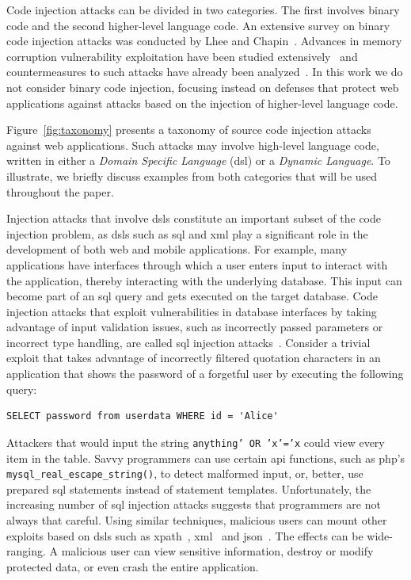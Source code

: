 \documentclass[10pt,journal,compsoc]{IEEEtran}
\begin{document}
Code injection attacks can be divided in two categories. The first
involves binary code and the second higher-level language code. An
extensive survey on binary code injection attacks was conducted by
Lhee and Chapin~\cite{LC03}. Advances in memory corruption vulnerability
exploitation have been studied extensively~\cite{PB04, SPWS13}
and countermeasures to such attacks
have already been analyzed~\cite{YJP12}.
In this work we do not consider binary code injection,
focusing instead on defenses
that protect web applications against attacks based on the
injection of higher-level language code.

Figure~\ref{fig:taxonomy} presents a taxonomy of source
code injection attacks against web applications.
Such attacks may involve high-level language code, written in either a
{\it Domain Specific Language} ({\sc dsl}) or a {\it Dynamic Language}.
To illustrate, we briefly discuss examples from both categories
that will be used throughout the paper.

Injection attacks that involve {\sc dsl}s constitute an important
subset of the code injection problem, as {\sc dsl}s such as
{\sc sql} and {\sc xml} play a significant role in the development of
both web and mobile applications. For example, many applications have
interfaces through which a user enters input to interact with the
application, thereby interacting with the underlying database. This
input can become part of an {\sc sql} query and gets executed on the
target database. Code injection attacks that exploit vulnerabilities
in database interfaces by taking advantage of input validation issues,
such as incorrectly passed parameters or incorrect type handling, are
called {\sc sql} injection attacks~\cite{MS09,HVO06,SW06}.
Consider a trivial exploit that takes advantage of incorrectly
filtered quotation characters in an application that shows the
password of a forgetful user by executing the following
query:

\lstset{language=SQL}
\begin{lstlisting}
SELECT password from userdata WHERE id = 'Alice'
\end{lstlisting}

\noindent
Attackers that would input the string {\tt anything' OR 'x'='x}
could view every item in the table.
Savvy programmers can use certain {\sc api} functions, such as {\sc php}'s
{\tt mysql\_real\_escape\_string()}, to detect malformed input, or,
better, use prepared {\sc sql} statements instead of statement
templates. Unfortunately, the increasing number of {\sc sql} injection
attacks suggests that programmers are not always that careful. Using
similar techniques, malicious users can mount other exploits based on
{\sc dsl}s such as {\sc xp}ath~\cite{SW06,CDL07,MKS09}, {\sc
  xml}~\cite{MSM13} and {\sc json}~\cite{SMS13}. The effects can be
wide-ranging. A malicious user can view sensitive information, destroy
or modify protected data, or even crash the entire application.
\end{document}
